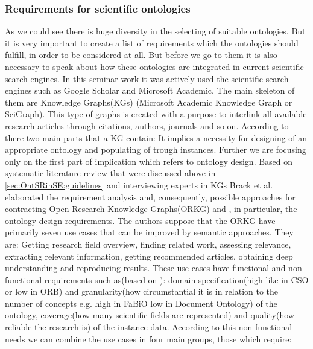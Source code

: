 		\subsubsection{Requirements for scientific ontologies}
		As we could see there is huge diversity in the selecting of suitable ontologies. But it is very important to create a list of requirements which the ontologies should fulfill, in order to be considered at all. But before we go to them it is also necessary to speak about how these ontologies are integrated in current scientific search engines.
		In this seminar work it was actively used the scientific search engines such as Google Scholar and Microsoft Academic. The main skeleton of them are Knowledge Graphs(KGs) (Microsoft Academic Knowledge Graph or SciGraph). This type of graphs is created with a purpose to interlink all available research articles through citations, authors, journals and so on. According to \cite{Bra20} there two main parts that a KG contain: \frqq\cite[p. 1, footnote 3]{Bra20} It implies a necessity for designing of an appropriate ontology and populating of trough instances. Further we are focusing only on the first part of implication which refers to ontology design.
		Based on systematic literature review\cite{Kit07} that were discussed above in \autoref{sec:OntSRinSE:guidelines} and interviewing experts in KGs Brack et al. \cite{Bra20} elaborated the requirement analysis and, consequently, possible approaches for contracting Open Research Knowledge Graphs(ORKG) and , in particular, the ontology design requirements. The authors suppose that the ORKG have primarily seven use cases that can be improved by semantic approaches. They are: Getting research field overview, finding related work, assessing relevance, extracting relevant information, getting recommended articles,  obtaining deep understanding and reproducing results. These use cases have functional and non-functional requirements such as(based on \cite[p. 8]{Bra20}): domain-specification(high like in CSO or low in ORB) and granularity(how circumstantial it is in relation to the number of concepts e.g. high in FaBiO low in Document Ontology) of the ontology, coverage(how many scientific fields are represented) and quality(how reliable the research is) of the instance data. According to this non-functional needs we can combine the use cases in four main groups, those which require: 
